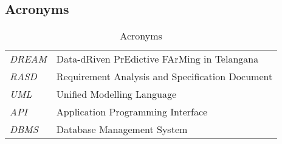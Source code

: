 \subsection{Acronyms}

\begin{center}
\setlength\tabcolsep{7pt}
\renewcommand{\arraystretch}{2}
\begin{longtable}{|m{1.5cm}|m{8.6cm}|}
\caption{Acronyms}\\
\hline
\endfirsthead
\endhead
\hline
\endlastfoot
\hline
\textit{DREAM} & Data-dRiven PrEdictive FArMing in Telangana\\
\textit{RASD} & Requirement Analysis and Specification Document\\ 
\textit{UML} & Unified Modelling Language\\
\textit{API} & Application Programming Interface\\
\textit{DBMS} & Database Management System\\
\hline
\end{longtable}
\end{center}